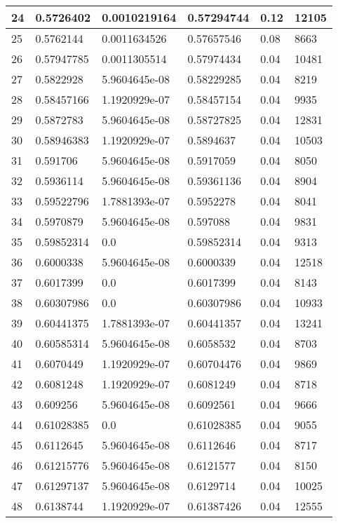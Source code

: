 \begin{longtable}{|l|l|l|l|l|l|}
24 & 0.5726402 & 0.0010219164 & 0.57294744 & 0.12 & 12105 \\ \hline 
25 & 0.5762144 & 0.0011634526 & 0.57657546 & 0.08 & 8663 \\ \hline 
26 & 0.57947785 & 0.0011305514 & 0.57974434 & 0.04 & 10481 \\ \hline 
27 & 0.5822928 & 5.9604645e-08 & 0.58229285 & 0.04 & 8219 \\ \hline 
28 & 0.58457166 & 1.1920929e-07 & 0.58457154 & 0.04 & 9935 \\ \hline 
29 & 0.5872783 & 5.9604645e-08 & 0.58727825 & 0.04 & 12831 \\ \hline 
30 & 0.58946383 & 1.1920929e-07 & 0.5894637 & 0.04 & 10503 \\ \hline 
31 & 0.591706 & 5.9604645e-08 & 0.5917059 & 0.04 & 8050 \\ \hline 
32 & 0.5936114 & 5.9604645e-08 & 0.59361136 & 0.04 & 8904 \\ \hline 
33 & 0.59522796 & 1.7881393e-07 & 0.5952278 & 0.04 & 8041 \\ \hline 
34 & 0.5970879 & 5.9604645e-08 & 0.597088 & 0.04 & 9831 \\ \hline 
35 & 0.59852314 & 0.0 & 0.59852314 & 0.04 & 9313 \\ \hline 
36 & 0.6000338 & 5.9604645e-08 & 0.6000339 & 0.04 & 12518 \\ \hline 
37 & 0.6017399 & 0.0 & 0.6017399 & 0.04 & 8143 \\ \hline 
38 & 0.60307986 & 0.0 & 0.60307986 & 0.04 & 10933 \\ \hline 
39 & 0.60441375 & 1.7881393e-07 & 0.60441357 & 0.04 & 13241 \\ \hline 
40 & 0.60585314 & 5.9604645e-08 & 0.6058532 & 0.04 & 8703 \\ \hline 
41 & 0.6070449 & 1.1920929e-07 & 0.60704476 & 0.04 & 9869 \\ \hline 
42 & 0.6081248 & 1.1920929e-07 & 0.6081249 & 0.04 & 8718 \\ \hline 
43 & 0.609256 & 5.9604645e-08 & 0.6092561 & 0.04 & 9666 \\ \hline 
44 & 0.61028385 & 0.0 & 0.61028385 & 0.04 & 9055 \\ \hline 
45 & 0.6112645 & 5.9604645e-08 & 0.6112646 & 0.04 & 8717 \\ \hline 
46 & 0.61215776 & 5.9604645e-08 & 0.6121577 & 0.04 & 8150 \\ \hline 
47 & 0.61297137 & 5.9604645e-08 & 0.6129714 & 0.04 & 10025 \\ \hline 
48 & 0.6138744 & 1.1920929e-07 & 0.61387426 & 0.04 & 12555 \\ \hline 

\end{longtable}
